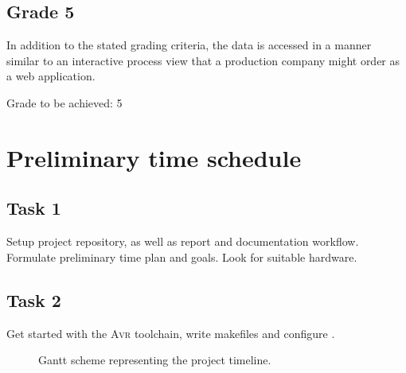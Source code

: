 \documentclass[10pt]{article}
\newcommand{\AVR}{\textsc{Avr}\xspace}
\begin{document}
\subsection*{Grade 5}%
\label{sub:grade_5}
In addition to the stated grading criteria, the data is accessed in a manner similar to an interactive process view that a production company might order as a web application.

Grade to be achieved: 5
\section*{Preliminary time schedule}%
\label{sec:preliminary_time_schedule}
\subsection*{Task 1}%
\label{sub:task_1}
Setup project repository, as well as report and documentation workflow. Formulate preliminary time plan and goals. Look for suitable hardware.
\subsection*{Task 2}%
\label{sub:task_2}
Get started with the \AVR toolchain, write makefiles and configure .


\begin{figure}[ht]
  \centering
  
  \caption{Gantt scheme representing the project timeline.}
  \label{fig:}
\end{figure}
\end{document}
